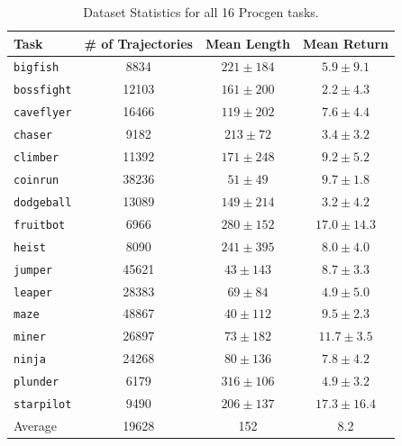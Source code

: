 \documentclass{article}
\begin{document}
\begin{table}[]
    \centering
    \caption{Dataset Statistics for all 16 Procgen tasks.}
    \begin{tabular}{l c c c}
    \toprule
    \textbf{Task} & \textbf{\# of Trajectories} &  \textbf{Mean Length}  & \textbf{Mean Return} \\
    \midrule
     \texttt{bigfish} &      8834 &    $221\pm184$ &  $ 5.9 \pm  9.1$\\
   \texttt{bossfight} &     12103 &    $161\pm200$ &  $ 2.2 \pm  4.3$\\
   \texttt{caveflyer} &     16466 &    $119\pm202$ &  $ 7.6 \pm  4.4$\\
      \texttt{chaser} &      9182 &    $213\pm72$  &  $ 3.4 \pm  3.2$\\
     \texttt{climber} &     11392 &    $171\pm248$ &  $ 9.2 \pm  5.2$\\
     \texttt{coinrun} &     38236 &     $51\pm49$  &  $ 9.7 \pm  1.8 $\\
   \texttt{dodgeball} &     13089 &    $149\pm214$ &  $ 3.2 \pm  4.2$\\
    \texttt{fruitbot} &      6966 &    $280\pm152$ &  $17.0 \pm 14.3 $\\
       \texttt{heist} &      8090 &    $241\pm395$ &  $ 8.0 \pm  4.0$\\
      \texttt{jumper} &     45621 &     $43\pm143$ &  $ 8.7 \pm  3.3$\\
      \texttt{leaper} &     28383 &     $69\pm84$  &  $ 4.9 \pm  5.0$\\
        \texttt{maze} &     48867 &     $40\pm112$ &  $ 9.5 \pm  2.3$\\
       \texttt{miner} &     26897 &     $73\pm182$ &  $11.7 \pm  3.5 $\\
       \texttt{ninja} &     24268 &     $80\pm136$ &  $ 7.8 \pm  4.2$\\
     \texttt{plunder} &      6179 &    $316\pm106$ &  $ 4.9 \pm  3.2$\\
   \texttt{starpilot} &      9490 &    $206\pm137$ &  $17.3 \pm 16.4 $\\
    \midrule
     Average &  19628 & 152 &  8.2\\
    \bottomrule
    \end{tabular}
    \label{tab:procgendata}
\end{table}
\end{document}
